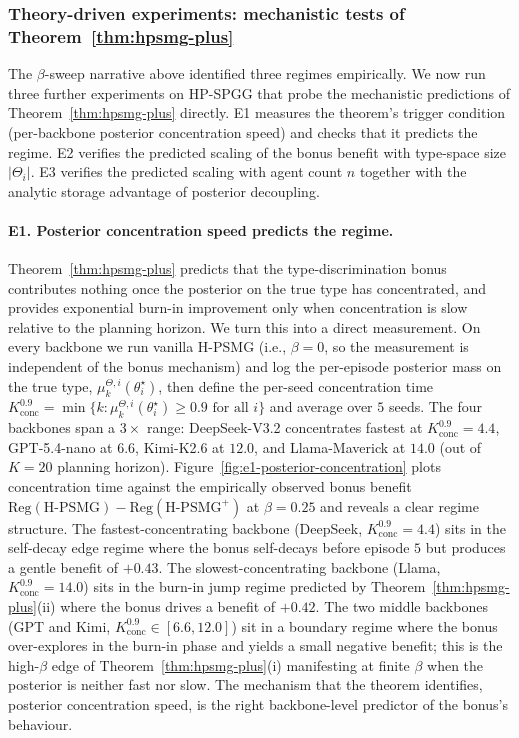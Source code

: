 \documentclass{article}
\begin{document}
\subsubsection{Theory-driven experiments: mechanistic tests of Theorem~\ref{thm:hpsmg-plus}}
\label{sec:theory-driven-experiments}

The $\beta$-sweep narrative above identified three regimes empirically. We now
run three further experiments on HP-SPGG that probe the mechanistic
predictions of Theorem~\ref{thm:hpsmg-plus} directly. E1 measures the
theorem's trigger condition (per-backbone posterior concentration speed) and
checks that it predicts the regime. E2 verifies the predicted scaling of the
bonus benefit with type-space size $|\Theta_i|$. E3 verifies the predicted
scaling with agent count $n$ together with the analytic storage advantage of
posterior decoupling.

\paragraph{E1. Posterior concentration speed predicts the regime.}
\label{sec:e1-posterior-concentration}
Theorem~\ref{thm:hpsmg-plus} predicts that the type-discrimination bonus
contributes nothing once the posterior on the true type has concentrated, and
provides exponential burn-in improvement only when concentration is slow
relative to the planning horizon. We turn this into a direct measurement.
On every backbone we run vanilla H-PSMG (i.e., $\beta = 0$, so the
measurement is independent of the bonus mechanism) and log the per-episode
posterior mass on the true type, $\mu_k^{\Theta, i}(\theta_i^\star)$, then
define the per-seed concentration time
$K_{\mathrm{conc}}^{0.9} = \min\{k : \mu_k^{\Theta, i}(\theta_i^\star) \geq 0.9
\text{ for all } i\}$ and average over $5$ seeds. The four backbones span a
$3\times$ range: DeepSeek-V3.2 concentrates fastest at
$K_{\mathrm{conc}}^{0.9} = 4.4$, GPT-5.4-nano at $6.6$, Kimi-K2.6 at $12.0$,
and Llama-Maverick at $14.0$ (out of $K = 20$ planning horizon). Figure~\ref{fig:e1-posterior-concentration}
plots concentration time against the empirically observed bonus benefit
$\mathrm{Reg}(\text{H-PSMG}) - \mathrm{Reg}(\text{H-PSMG}^+)$ at $\beta = 0.25$
and reveals a clear regime structure. The fastest-concentrating backbone
(DeepSeek, $K_{\mathrm{conc}}^{0.9} = 4.4$) sits in the self-decay edge regime
where the bonus self-decays before episode $5$ but produces a gentle benefit
of $+0.43$. The slowest-concentrating backbone (Llama, $K_{\mathrm{conc}}^{0.9} = 14.0$)
sits in the burn-in jump regime predicted by Theorem~\ref{thm:hpsmg-plus}(ii)
where the bonus drives a benefit of $+0.42$. The two middle backbones
(GPT and Kimi, $K_{\mathrm{conc}}^{0.9} \in [6.6, 12.0]$) sit in a boundary
regime where the bonus over-explores in the burn-in phase and yields a small
negative benefit; this is the high-$\beta$ edge of Theorem~\ref{thm:hpsmg-plus}(i)
manifesting at finite $\beta$ when the posterior is neither fast nor slow.
The mechanism that the theorem identifies, posterior concentration speed, is
the right backbone-level predictor of the bonus's behaviour.
\end{document}
